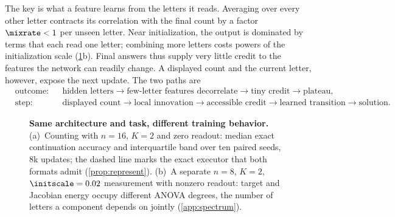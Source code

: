 The key is what a feature learns from the letters it reads. Averaging over every other letter contracts its correlation with the
final count by a factor $\mixrate<1$ per unseen letter. Near initialization, the output is dominated by terms that each read one letter;
combining more letters costs powers of the initialization scale (\cref{fig:overview}b). Final answers thus supply very little credit
to the features the network can readily change. A displayed count and the current letter, however, expose the next update. The two paths are
{\small
\[
\begin{aligned}
 &\text{outcome:}&&\text{hidden letters}\to\text{few-letter features decorrelate}\to\text{tiny credit}\to\text{plateau},\\
 &\text{step:}&&\text{displayed count}\to\text{local innovation}\to\text{accessible credit}\to\text{learned transition}\to\text{solution}.
\end{aligned}
\]
}

\begin{figure}[t]
\centering

\caption{\textbf{Same architecture and task, different training behavior.}
(a)~Counting with $n=16$, $K=2$ and zero readout: median exact continuation accuracy and interquartile band over ten paired seeds, $8$k
updates; the dashed line marks the exact executor that both formats admit (\cref{prop:represent}).
(b)~A separate $n=8$, $K=2$, $\initscale=0.02$ measurement with nonzero readout: target and Jacobian energy occupy different ANOVA degrees, the number of letters a component depends on jointly (\cref{app:spectrum}).}
\label{fig:overview}
\end{figure}

